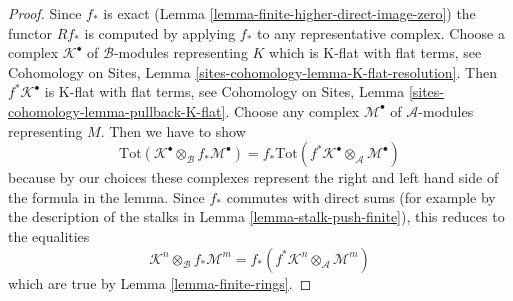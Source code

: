 \documentclass[10pt,a4paper]{amsart}
\theoremstyle{plain}
\theoremstyle{definition}
\theoremstyle{remark}
\numberwithin{equation}{subsection}
\begin{document}
\begin{proof}
Since $f_*$ is exact (Lemma \ref{lemma-finite-higher-direct-image-zero})
the functor $Rf_*$ is computed by applying $f_*$ to any representative complex.
Choose a complex $\mathcal{K}^\bullet$ of $\mathcal{B}$-modules
representing $K$ which is K-flat with flat terms, see
Cohomology on Sites, Lemma \ref{sites-cohomology-lemma-K-flat-resolution}.
Then $f^*\mathcal{K}^\bullet$ is K-flat with flat terms, see
Cohomology on Sites, Lemma \ref{sites-cohomology-lemma-pullback-K-flat}.
Choose any complex $\mathcal{M}^\bullet$ of $\mathcal{A}$-modules
representing $M$. Then
we have to show
$$
\text{Tot}(\mathcal{K}^\bullet \otimes_\mathcal{B} f_*\mathcal{M}^\bullet)
=
f_*\text{Tot}(f^*\mathcal{K}^\bullet \otimes_\mathcal{A} \mathcal{M}^\bullet)
$$
because by our choices these complexes represent the right and left hand
side of the formula in the lemma.
Since $f_*$ commutes with direct sums
(for example by the description of the stalks in
Lemma \ref{lemma-stalk-push-finite}),
this reduces to the equalities
$$
\mathcal{K}^n \otimes_\mathcal{B} f_*\mathcal{M}^m
=
f_*(f^*\mathcal{K}^n \otimes_\mathcal{A} \mathcal{M}^m)
$$
which are true by Lemma \ref{lemma-finite-rings}.
\end{proof}
\end{document}
